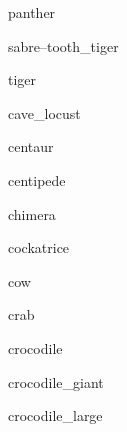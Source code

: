 \documentclass[letterpaper,serif]{module}
\begin{document}
\begin{newmonster}{panther}\end{newmonster}

\begin{newmonster}{sabre--tooth_tiger}\end{newmonster}

\begin{newmonster}{tiger}\end{newmonster}

\begin{newmonster}{cave_locust}\end{newmonster}

\begin{newmonster}{centaur}\end{newmonster}

\begin{newmonster}{centipede}\end{newmonster}

\begin{newmonster}{chimera}\end{newmonster}

\begin{newmonster}{cockatrice}\end{newmonster}

\begin{newmonster}{cow}\end{newmonster}

\begin{newmonster}{crab}\end{newmonster}

\begin{newmonster}{crocodile}\end{newmonster}

\begin{newmonster}{crocodile_giant}\end{newmonster}

\begin{newmonster}{crocodile_large}\end{newmonster}
\end{document}

